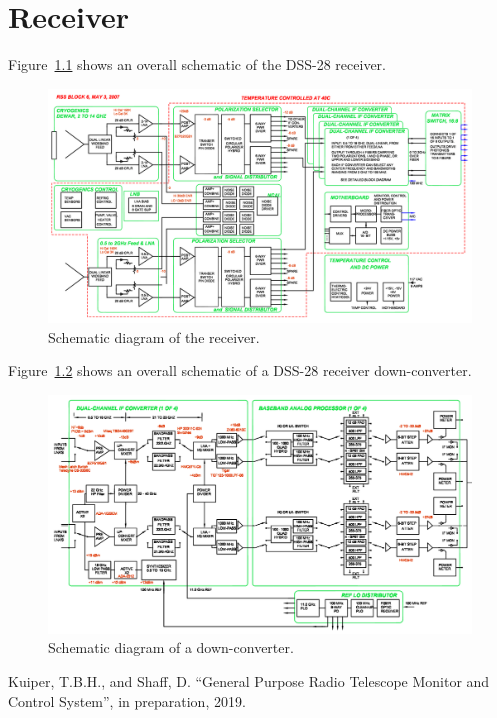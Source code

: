 \documentclass[letterpaper,11pt]{report}
\begin{document}
\chapter{Receiver}\label{sec:dss28rx}

Figure~\ref{fig:rx-overview} shows an overall schematic of the DSS-28 receiver.
\begin{figure}[h!tb]
    \begin{center}
        \includegraphics[width=\textwidth]{Block6A_3May07-r.png}
        \caption{\label{fig:rx-overview}Schematic diagram of the
            receiver.}
    \end{center}
\end{figure}
Figure~\ref{fig:rx-dc} shows an overall schematic of a DSS-28 receiver down-converter.
\begin{figure}[h!tb]
    \begin{center}
        \includegraphics[width=\textwidth]{Block6B_3May07-r.png}
        \caption{\label{fig:rx-dc}Schematic diagram of a down-converter.}
    \end{center}
\end{figure}

\begin{thebibliography}{widestlabel}
   Kuiper, T.B.H., and Shaff, D. ``General Purpose Radio Telescope Monitor and
   Control System'', in preparation, 2019.
\end{thebibliography}
\end{document}
